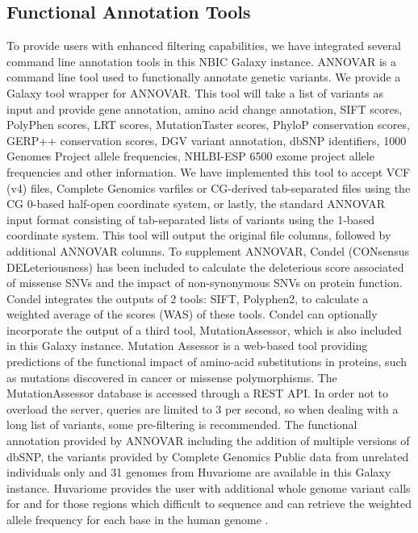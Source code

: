 \documentclass[10pt]{bmc_article}
\newenvironment{bmcformat}{\begin{raggedright}\baselineskip20pt\sloppy\setboolean{publ}{false}}{\end{raggedright}\baselineskip20pt\sloppy}
\begin{document}
\begin{bmcformat}
\subsection*{Functional Annotation Tools}
To provide users with enhanced filtering capabilities, we have integrated several command line annotation tools in this NBIC Galaxy instance. ANNOVAR \cite{annovar} is a command line tool used to functionally annotate genetic variants. We provide a Galaxy tool wrapper for ANNOVAR. This tool will take a list of variants as input and provide gene annotation, amino acid change annotation, SIFT scores, PolyPhen scores, LRT scores, MutationTaster scores, PhyloP conservation scores, GERP++ conservation scores, DGV variant annotation, dbSNP identifiers, 1000 Genomes Project allele frequencies, NHLBI-ESP 6500 exome project allele frequencies and other information.  We have implemented this tool to accept VCF (v4) files, Complete Genomics varfiles or CG-derived tab-separated files using the CG 0-based half-open coordinate system, or lastly, the standard ANNOVAR input format consisting of tab-separated lists of variants using the 1-based coordinate system.  This tool will output the original file columns, followed by additional ANNOVAR columns.  To supplement ANNOVAR, Condel (CONsensus DELeteriousness) \cite{condel} has been included to calculate the deleterious score associated of missense SNVs and the impact of non-synonymous SNVs on protein function. Condel integrates the outputs of 2 tools: SIFT, Polyphen2, to calculate a weighted average of the scores (WAS) of these tools. Condel can optionally incorporate the output of a third tool, MutationAssessor, which is also included in this Galaxy instance. Mutation Assessor \cite{mutass} is a web-based tool providing predictions of the functional impact of amino-acid substitutions in proteins, such as mutations discovered in cancer or missense polymorphisms. The MutationAssessor database is accessed through a REST API.  In order not to overload the server, queries are limited to 3 per second, so when dealing with a long list of variants, some pre-filtering is recommended. The functional annotation provided by ANNOVAR including the addition of multiple versions of dbSNP, the variants provided by Complete Genomics Public data from unrelated individuals only \cite{url-cgftp} and 31 genomes from Huvariome \cite{huvariome} are available in this Galaxy instance. Huvariome provides the user with additional whole genome variant calls for and for those regions which difficult to sequence and can retrieve the weighted allele frequency for each base in the human genome \cite{huvariome}.   


\end{bmcformat}
\end{document}

